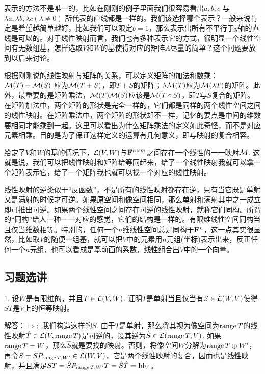 \documentclass[hyperref,]{ctexart}
\begin{document}
表示的方法不是唯一的，比如在刚刚的例子里面我们很容易看出\(a,b,c\)
与\(\lambda a, \lambda b,\lambda c (\lambda\ne 0)\)
所代表的直线都是一样的。我们该选择哪个表示？一般来说肯定是希望越简单越好，比如我们可以限定\(b=1\)，那么表示出所有不平行于\(y\)轴的直线是可以的。对于线性映射而言，我们也有多种表示它的方式，很明显一个线性空间有无数组基，怎样选取\(V\)和\(W\)的基使得对应的矩阵\(A\)尽量的简单？这个问题要放到以后来讨论。

根据刚刚说的线性映射与矩阵的关系，可以定义矩阵的加法和数乘：\(\mathcal{M}(T)+\mathcal{M}(S)\)
应为\(\mathcal{M}(T+S)\)，即\(T+S\)的矩阵；\(\lambda\mathcal{M}(T)\)应为\(\mathcal{M}(\lambda T)\)的矩阵。此外，最重要的是矩阵乘法，\(\mathcal{M}(T)\mathcal{M}(S)\)应该是\(\mathcal{M}(T\circ S)\)，即\(T\)与\(S\)复合的矩阵。在矩阵加法中，两个矩阵的形状是完全一样的，它们都是同样的两个线性空间之间的线性映射。在矩阵乘法中，两个矩阵的形状却不一样，记忆的要点是中间的维数要相同才能乘到一起。这里可以看出为什么矩阵乘法的定义如此奇怪，而不是对应元素相乘。目的是为了保证这样定义的运算有几何意义，即与映射的复合相容。

给定了\(V\)和\(W\)的基的情况下，\(\mathcal{L}(V,W)\)与\(\mathbf{F}^{n\times m}\)之间存在一个线性的一一映射\(\mathcal{M}\).
这就是说，我们可以把线性映射和矩阵给等同起来，给了一个线性映射我就可以拿一个矩阵表示它，给了一个矩阵我也就可以找一个对应的线性映射。

线性映射的逆类似于``反函数''，不是所有的线性映射都存在逆，只有当它既是单射又是满射的时候才可逆。如果原空间和像空间相同，那么单射和满射其中之一成立即可推出可逆。如果两个线性空间之间存在可逆的线性映射，就称它们同构。所谓的``同构''给人一种一一对应的感觉，它们的结构是一样的。有限维线性空间同构当且仅当维数相等。特别的，任何一个\(n\)维线性空间总是同构于\(\mathbf{F}^n\)，这一点其实很显然，比如取\(V\)的随便一组基，就可以把\(V\)中的元素用\(n\)元组(坐标)表示出来，反正任何一个\(n\)元组，也可以看成是基前面的系数，线性组合出\(V\)中的一个向量。

\subsection{习题选讲}\label{ux4e60ux9898ux9009ux8bb2}

\noindent{}1. 设\(W\)是有限维的，并且\(T \in \mathcal{L}(V,W)\).
证明\(T\)是单射当且仅当有\(S\in\mathcal{L}(W,V)\)使得\(ST\)是\(V\)上的恒等映射。

\smallskip

\noindent{}解答：\(\Rightarrow:\) 我们构造这样的\(S\).
由于\(T\)是单射，那么将其视为像空间为\(\mathrm{range}\, T\)的线性映射\(\hat{T}\in\mathcal{L}(V,\mathrm{range}\, T)\)是可逆的，设其逆为\(\hat{S}\in\mathcal{L}(\mathrm{range}\, T,V)\).
如果\(\mathrm{range}\, T = W\)，那么\(\hat{S}\)就是要找的映射。否则，将像空间\(W\)分解为\(\mathrm{range}\, T\oplus W'\)，再令\(S = \hat{S} P_{\mathrm{range}\, T,W'} \in \mathcal{L}(W,V)\)，它是两个线性映射的复合，因而也是线性映射，并且满足\(ST = \hat{S}P_{\mathrm{range}\, T,W'}T = \hat{S}\hat{T}=\mathrm{Id}_V\)。
\end{document}
